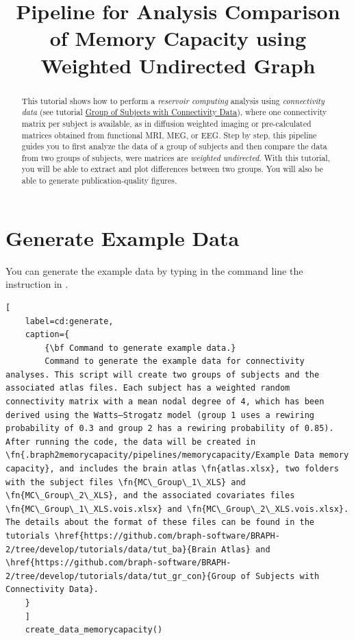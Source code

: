 \documentclass[justified]{tufte-handout}
\title[Analysis and Comparison of Memory Capacity WU]{Pipeline for Analysis Comparison of Memory Capacity using Weighted Undirected Graph}
\begin{document}
\maketitle

\begin{abstract}
\noindent
This tutorial shows how to perform a \emph{reservoir computing} analysis using \emph{connectivity data} (see tutorial \href{https://github.com/braph-software/BRAPH-2/tree/develop/tutorials/data/tut_gr_con}{Group of Subjects with Connectivity Data}), where one connectivity matrix per subject is available, as in diffusion weighted imaging or pre-calculated matrices obtained from functional MRI, MEG, or EEG. Step by step, this pipeline guides you to first analyze the data of a group of subjects and then compare the data from two groups of subjects, were matrices are \emph{weighted undirected}.  With this tutorial, you will be able to extract and plot differences between two groups. You will also be able to generate publication-quality figures.
\end{abstract}

\tableofcontents

\clearpage
\section{Generate Example Data}

You can generate the example data by typing in the command line the instruction in .

\begin{lstlisting}[
	label=cd:generate,
	caption={
		{\bf Command to generate example data.}
		Command to generate the example data for connectivity analyses. This script will create two groups of subjects and the associated atlas files. Each subject has a weighted random connectivity matrix with a mean nodal degree of 4, which has been derived using the Watts–Strogatz model (group 1 uses a rewiring probability of 0.3 and group 2 has a rewiring probability of 0.85). After running the code, the data will be created in \fn{.braph2memorycapacity/pipelines/memorycapacity/Example Data memory capacity}, and includes the brain atlas \fn{atlas.xlsx}, two folders with the subject files \fn{MC\_Group\_1\_XLS} and \fn{MC\_Group\_2\_XLS}, and the associated covariates files \fn{MC\_Group\_1\_XLS.vois.xlsx} and \fn{MC\_Group\_2\_XLS.vois.xlsx}. The details about the format of these files can be found in the tutorials \href{https://github.com/braph-software/BRAPH-2/tree/develop/tutorials/data/tut_ba}{Brain Atlas} and \href{https://github.com/braph-software/BRAPH-2/tree/develop/tutorials/data/tut_gr_con}{Group of Subjects with Connectivity Data}.
	}
	]
	create_data_memorycapacity()
\end{lstlisting}
\end{document}
